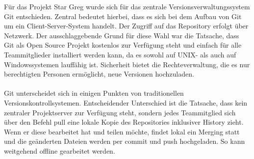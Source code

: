 Für das Projekt Star Greg wurde sich für das zentrale Versionsverwaltungssystem Git entschieden. Zentral bedeutet hierbei, dass es sich bei dem Aufbau von Git um ein Client-Server-System handelt. Der Zugriff auf das Repository erfolgt über Netzwerk. Der ausschlaggebende Grund für diese Wahl war die Tatsache, dass Git als Open Source Projekt kostenlos zur Verfügung steht und einfach für alle Teammitglieder installiert werden kann, da es sowohl auf UNIX- als auch auf Windowssystemen lauffähig ist. Sicherheit bietet die Rechteverwaltung, die es nur berechtigten Personen ermöglicht, neue Versionen hochzuladen. 
\\
\\
Git unterscheidet sich in einigen Punkten von traditionellen Versionskontrollsystemen. Entscheidender Unterschied ist die Tatsache, dass kein zentraler Projektserver zur Verfügung steht, sondern jedes Teammitglied sich über den Befehl pull eine lokale Kopie des Repositories inklusiver History zieht. Wenn er diese bearbeitet hat und teilen möchte, findet lokal ein Merging  statt und die geänderten Dateien werden per commit und push hochgeladen. So kann weitgehend offline gearbeitet werden. 

\\
\autorende{}